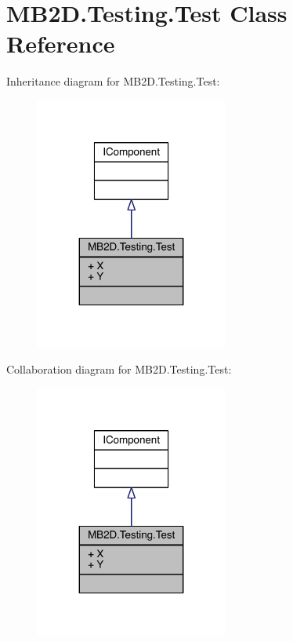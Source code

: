 \hypertarget{class_m_b2_d_1_1_testing_1_1_test}{}\section{M\+B2\+D.\+Testing.\+Test Class Reference}
\label{class_m_b2_d_1_1_testing_1_1_test}


Inheritance diagram for M\+B2\+D.\+Testing.\+Test\+:
\nopagebreak
\begin{figure}[H]
\begin{center}
\leavevmode
\includegraphics[width=179pt]{class_m_b2_d_1_1_testing_1_1_test__inherit__graph}
\end{center}
\end{figure}


Collaboration diagram for M\+B2\+D.\+Testing.\+Test\+:
\nopagebreak
\begin{figure}[H]
\begin{center}
\leavevmode
\includegraphics[width=179pt]{class_m_b2_d_1_1_testing_1_1_test__coll__graph}
\end{center}
\end{figure}
